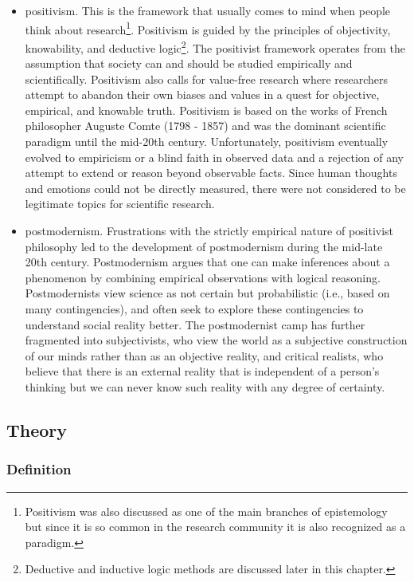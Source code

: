 \begin{itemize}
	\item \Gls{positivism}. This is the framework that usually comes to mind when people think about research\footnote{Positivism was also discussed as one of the main branches of epistemology but since it is so common in the research community it is also recognized as a paradigm.}. Positivism is guided by the principles of objectivity, knowability, and deductive logic\footnote{Deductive and inductive logic methods are discussed later in this chapter.}. The positivist framework operates from the assumption that society can and should be studied empirically and scientifically. Positivism also calls for value-free research where researchers attempt to abandon their own biases and values in a quest for objective, empirical, and knowable truth. Positivism is based on the works of French philosopher Auguste Comte (1798 - 1857) and was the dominant scientific paradigm until the mid-20th century. Unfortunately, positivism eventually evolved to empiricism or a blind faith in observed data and a rejection of any attempt to extend or reason beyond observable facts. Since human thoughts and emotions could not be directly measured, there were not considered to be legitimate topics for scientific research. 

	\item \Gls{postmodernism}. Frustrations with the strictly empirical nature of positivist philosophy led to the development of postmodernism during the mid-late 20th century. Postmodernism argues that one can make inferences about a phenomenon by combining empirical observations with logical reasoning. Postmodernists view science as not certain but probabilistic (i.e., based on many contingencies), and often seek to explore these contingencies to understand social reality better. The postmodernist camp has further fragmented into subjectivists, who view the world as a subjective construction of our minds rather than as an objective reality, and critical realists, who believe that there is an external reality that is independent of a person's thinking but we can never know such reality with any degree of certainty.

\end{itemize}

\subsection{Theory}

\subsubsection{Definition}

